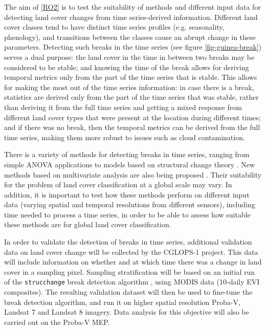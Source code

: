\documentclass[10pt]{article}
\begin{document}
\begin{mdframed}[style=table,frametitle=\textbf{7. DETAILED DESCRIPTION OF THE RESEARCH PLAN} (max. 2500 words + 1 page literature list)]
The aim of \ref{RO2} is to test the suitability of methods and different input data for detecting land cover changes from time series-derived information. Different land cover classes tend to have distinct time series profiles (e.g. seasonality, phenology), and transitions between the classes cause an abrupt change in these parameters. Detecting such breaks in the time series (see figure \ref{fig-guinea-break}) serves a dual purpose: the land cover in the time in between two breaks may be considered to be stable; and knowing the time of the break allows for deriving temporal metrics only from the part of the time series that is stable. This allows for making the most out of the time series information: in case there is a break, statistics are derived only from the part of the time series that was stable, rather than deriving it from the full time series and getting a mixed response from different land cover types that were present at the location during different times; and if there was no break, then the temporal metrics can be derived from the full time series, making them more robust to issues such as cloud contamination.

There is a variety of methods for detecting breaks in time series, ranging from simple ANOVA applications to models based on structural change theory \citep{bai_least_1994, zeileis_testing_2003}. New methods based on multivariate analysis are also being proposed \citep{lu_spatio-temporal_2016}. Their suitability for the problem of land cover classification at a global scale may vary. In addition, it is important to test how these methods perform on different input data (varying spatial and temporal resolutions from different sensors), including time needed to process a time series, in order to be able to assess how suitable these methods are for global land cover classification.

In order to validate the detection of breaks in time series, additional validation data on land cover change will be collected by the CGLOPS-1 project. This data will include information on whether and at which time there was a change in land cover in a sampling pixel. Sampling stratification will be based on an initial run of the \texttt{strucchange} break detection algorithm \citep{zeileis_testing_2003}, using MODIS data (10-daily EVI composites). The resulting validation dataset will then be used to fine-tune the break detection algorithm, and run it on higher spatial resolution Proba-V, Landsat 7 and Landsat 8 imagery. Data analysis for this objective will also be carried out on the Proba-V MEP.


\end{mdframed}
\end{document}
